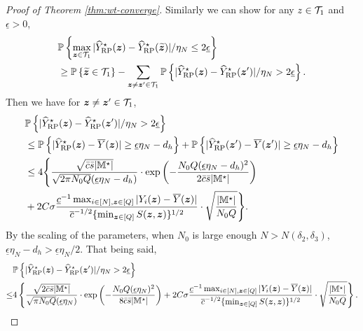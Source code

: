 \documentclass[12pt]{article}
\begin{document}
\begin{proof}[Proof of Theorem \ref{thm:wt-converge}]
Similarly we can show for any $z\in{\mathcal{T}}_{1}$ and $\underline{\epsilon}>0$,
\begin{align*} 
    &{\mathbb{P}}\left\{\max_{{\boldsymbol{z}}\in{\mathcal{T}}_{1}}|{\widehat{Y}}^\star_{\operatorname{RP}}({\boldsymbol{z}}) - {\widehat{Y}}^\star_{\operatorname{RP}}(\widetilde{{\boldsymbol{z}}})|/\eta_N \le 2\underline{\epsilon}\right\} \\
    & \ge {\mathbb{P}}\left\{\widetilde{{\boldsymbol{z}}}\in{\mathcal{T}}_{1}\right\}  
     - \sum_{{\boldsymbol{z}}\neq {\boldsymbol{z}}'\in{\mathcal{T}}_{1}}{\mathbb{P}}\left\{|{\widehat{Y}}^\star_{\operatorname{RP}}({\boldsymbol{z}}) - {\widehat{Y}}^\star_{\operatorname{RP}}({{\boldsymbol{z}}'})|/\eta_N > 2\underline{\epsilon}\right\}.\notag
\end{align*}
Then we have for ${\boldsymbol{z}}\neq {\boldsymbol{z}}'\in{\mathcal{T}}_{1}$,
\begin{align*}
    &{\mathbb{P}}\left\{|{\widehat{Y}}^\star_{\operatorname{RP}}({\boldsymbol{z}}) - {\widehat{Y}}^\star_{\operatorname{RP}}({{\boldsymbol{z}}'})|/\eta_N > 2\underline{\epsilon}\right\} \\
    & \le {\mathbb{P}}\left\{|{\widehat{Y}}^\star_{\operatorname{RP}}({\boldsymbol{z}})-\overline{Y}({\boldsymbol{z}})|\ge  {\underline{\epsilon}\eta_N - d_h}   \right\} + {\mathbb{P}}\left\{|{\widehat{Y}}^\star_{\operatorname{RP}}({\boldsymbol{z}}') - \overline{Y}({{\boldsymbol{z}}'})|\ge  {\underline{\epsilon}\eta_N - d_h}   \right\}\\
    &\le 4\Bigg\{ \frac{\sqrt{\bar{c}\bar{s}|{\mathbb{M}}^\star|}}{\sqrt{2\pi N_0Q }({\underline{\epsilon}\eta_N - d_h})}\cdot \exp\left(-\frac{ N_0Q ({\underline{\epsilon}\eta_N - d_h})^{  2}}{2\bar{c}\bar{s}|{\mathbb{M}}^\star|}\right)\\
    &+ 2C\sigma   \frac{ \underline{c}^{-1} \max_{i\in[N],{\boldsymbol{z}}\in[Q]}|Y_i({\boldsymbol{z}})-\overline{Y}({\boldsymbol{z}})|}{ {\overline{c}^{-1/2} \{\min_{{\boldsymbol{z}}\in[Q]} S({\boldsymbol{z}},{\boldsymbol{z}})}\}^{1/2}}\cdot \sqrt{\frac{|{\mathbb{M}}^\star|}{N_0Q}}\Bigg\}.
\end{align*}
By the scaling of the parameters, when $N_0$ is large enough $N>N(\delta_2,\delta_3)$, $\underline{\epsilon}\eta_N-d_h >\underline{\epsilon}\eta_N/2$. That being said,
\begin{align*}
    &{\mathbb{P}}\left\{|{\widehat{Y}}^\star_{\operatorname{RP}}({\boldsymbol{z}}) - {\widehat{Y}}^\star_{\operatorname{RP}}({{\boldsymbol{z}}'})|/\eta_N > 2\underline{\epsilon}\right\} \\
    \le & 4\left\{ \frac{\sqrt{2\bar{c}\bar{s} |{\mathbb{M}}^\star|}}{\sqrt{\pi N_0Q }({\underline{\epsilon}\eta_N})}\cdot \exp\left(-\frac{ N_0Q ({\underline{\epsilon}\eta_N})^{  2}}{8\bar{c}\bar{s} |{\mathbb{M}}^\star|}\right)
    +  2C\sigma   \frac{ \underline{c}^{-1} \max_{i\in[N],{\boldsymbol{z}}\in[Q]}|Y_i({\boldsymbol{z}})-\overline{Y}({\boldsymbol{z}})|}{ {\overline{c}^{-1/2} \{\min_{{\boldsymbol{z}}\in[Q]} S({\boldsymbol{z}},{\boldsymbol{z}})}\}^{1/2}}\cdot \sqrt{\frac{|{\mathbb{M}}^\star|}{N_0Q}}\right\}.
\end{align*}


\end{proof}
\end{document}
